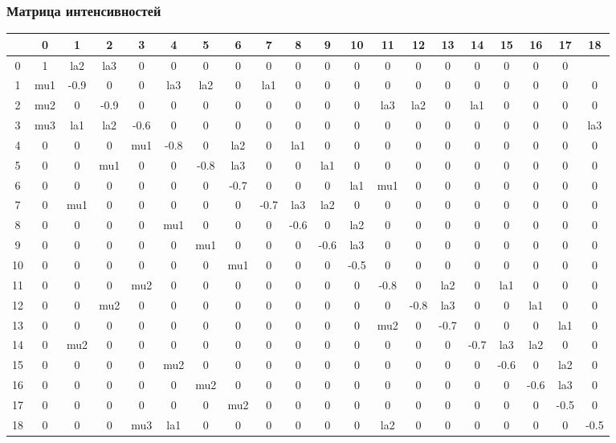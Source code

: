\subsubsection{Матрица интенсивностей}

\begin{adjustbox}{max width=\textwidth}
\begin{tabular}{|c|c|c|c|c|c|c|c|c|c|c|c|c|c|c|c|c|c|c|c|}
\hline
  & 0 & 1 & 2 & 3 & 4 & 5 & 6 & 7 & 8 & 9 & 10 & 11 & 12 & 13 & 14 & 15 & 16 & 17 & 18 \\ \hline
0 & 1 & la2 & la3 & 0 & 0 & 0 & 0 & 0 & 0 & 0 & 0 & 0 & 0 & 0 & 0 & 0 & 0 & 0 \\ \hline
1 & mu1 & -0.9 & 0 & 0 & la3 & la2 & 0 & la1 & 0 & 0 & 0 & 0 & 0 & 0 & 0 & 0 & 0 & 0 & 0 \\ \hline
2 & mu2 & 0 & -0.9 & 0 & 0 & 0 & 0 & 0 & 0 & 0 & 0 & la3 & la2 & 0 & la1 & 0 & 0 & 0 & 0 \\ \hline
3 & mu3 & la1 & la2 & -0.6 & 0 & 0 & 0 & 0 & 0 & 0 & 0 & 0 & 0 & 0 & 0 & 0 & 0 & 0 & la3 \\ \hline
4 & 0 & 0 & 0 & mu1 & -0.8 & 0 & la2 & 0 & la1 & 0 & 0 & 0 & 0 & 0 & 0 & 0 & 0 & 0 & 0 \\ \hline
5 & 0 & 0 & mu1 & 0 & 0 & -0.8 & la3 & 0 & 0 & la1 & 0 & 0 & 0 & 0 & 0 & 0 & 0 & 0 & 0 \\ \hline
6 & 0 & 0 & 0 & 0 & 0 & 0 & -0.7 & 0 & 0 & 0 & la1 & mu1 & 0 & 0 & 0 & 0 & 0 & 0 & 0 \\ \hline
7 & 0 & mu1 & 0 & 0 & 0 & 0 & 0 & -0.7 & la3 & la2 & 0 & 0 & 0 & 0 & 0 & 0 & 0 & 0 & 0 \\ \hline
8 & 0 & 0 & 0 & 0 & mu1 & 0 & 0 & 0 & -0.6 & 0 & la2 & 0 & 0 & 0 & 0 & 0 & 0 & 0 & 0 \\ \hline
9 & 0 & 0 & 0 & 0 & 0 & mu1 & 0 & 0 & 0 & -0.6 & la3 & 0 & 0 & 0 & 0 & 0 & 0 & 0 & 0 \\ \hline
10 & 0 & 0 & 0 & 0 & 0 & 0 & mu1 & 0 & 0 & 0 & -0.5 & 0 & 0 & 0 & 0 & 0 & 0 & 0 & 0 \\ \hline
11 & 0 & 0 & 0 & mu2 & 0 & 0 & 0 & 0 & 0 & 0 & 0 & -0.8 & 0 & la2 & 0 & la1 & 0 & 0 & 0 \\ \hline
12 & 0 & 0 & mu2 & 0 & 0 & 0 & 0 & 0 & 0 & 0 & 0 & 0 & -0.8 & la3 & 0 & 0 & la1 & 0 & 0 \\ \hline
13 & 0 & 0 & 0 & 0 & 0 & 0 & 0 & 0 & 0 & 0 & 0 & mu2 & 0 & -0.7 & 0 & 0 & 0 & la1 & 0 \\ \hline
14 & 0 & mu2 & 0 & 0 & 0 & 0 & 0 & 0 & 0 & 0 & 0 & 0 & 0 & 0 & -0.7 & la3 & la2 & 0 & 0 \\ \hline
15 & 0 & 0 & 0 & 0 & mu2 & 0 & 0 & 0 & 0 & 0 & 0 & 0 & 0 & 0 & 0 & -0.6 & 0 & la2 & 0 \\ \hline
16 & 0 & 0 & 0 & 0 & 0 & mu2 & 0 & 0 & 0 & 0 & 0 & 0 & 0 & 0 & 0 & 0 & -0.6 & la3 & 0 \\ \hline
17 & 0 & 0 & 0 & 0 & 0 & 0 & mu2 & 0 & 0 & 0 & 0 & 0 & 0 & 0 & 0 & 0 & 0 & -0.5 & 0 \\ \hline
18 & 0 & 0 & 0 & mu3 & la1 & 0 & 0 & 0 & 0 & 0 & 0 & la2 & 0 & 0 & 0 & 0 & 0 & 0 & -0.5 \\ \hline

\end{tabular}
\end{adjustbox}

